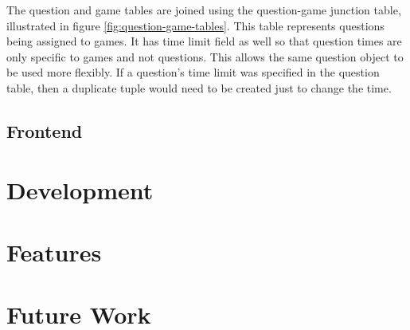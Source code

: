 \documentclass{article}
\begin{document}
		The question and game tables are joined using the question-game junction table, illustrated in figure \ref{fig:question-game-tables}. This table represents questions being assigned to games. It has time limit field as well so that question times are only specific to games and not questions. This allows the same question object to be used more flexibly. If a question's time limit was specified in the question table, then a duplicate tuple would need to be created just to change the time.

	\subsection{Frontend}

\section{Development}
\section{Features}
\section{Future Work}

\printbibliography[title={Bibliography}]
\end{document}
